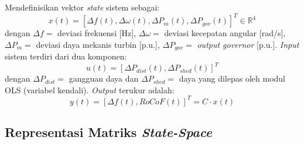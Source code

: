 Mendefinisikan vektor \textit{state} sistem sebagai:
\begin{equation}
    x(t) = [\Delta f(t), \Delta\omega(t), \Delta P_{m}(t), \Delta P_{gov}(t)]^{T} \in \mathbb{R}^{4}
\end{equation}
dengan $\Delta f=$ deviasi frekuensi [Hz], $\Delta\omega=$ deviasi kecepatan angular [rad/s], $\Delta P_{m}=$ deviasi daya mekanis turbin [p.u.], $\Delta P_{gov}=$ \textit{output governor} [p.u.]. \textit{Input} sistem terdiri dari dua komponen:
\begin{equation}
    u(t) = [\Delta P_{dist}(t), \Delta P_{shed}(t)]^{T}
\end{equation}
dengan $\Delta P_{dist}=$ gangguan daya dan $\Delta P_{shed}=$ daya yang dilepas oleh modul OLS (variabel kendali). \textit{Output} terukur adalah:
\begin{equation}
    y(t) = [\Delta f(t), RoCoF(t)]^{T} = C\cdot x(t)
\end{equation}

\subsection{Representasi Matriks \textit{State-Space}}
\label{subsec:Representasi_Matriks_State_Space}

